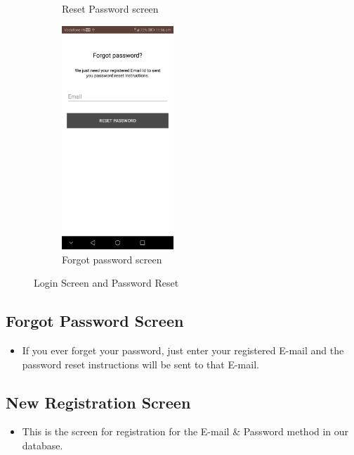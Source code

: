 \documentclass{report}
\begin{document}
\begin{figure}[h!]
\begin{subfigure}[b]{.26\textwidth}
\caption{\centering Reset Password screen}
\end{subfigure}
\begin{subfigure}[b]{.26\textwidth}
\centering
\includegraphics[width=4.2cm]{forgot_password.jpg}
\caption{\centering Forgot password screen}
\end{subfigure}
\caption{Login Screen and Password Reset} 
\label{fig:NASA_Logo}
\end{figure}

\pagebreak

\subsection{Forgot Password Screen}
\begin{itemize}
\item If you ever forget your password, just enter your registered E-mail and the password reset instructions will be sent to that E-mail.
\end{itemize}


\subsection{New Registration Screen}
\begin{itemize}
\item This is the screen for registration for the E-mail \& Password method in our database.
\end{itemize}
\end{document}
